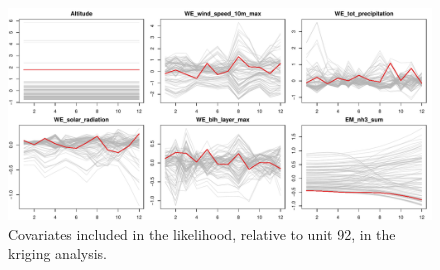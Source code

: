 \documentclass[12pt,	%
	a4paper,		%
	twoside,		%
	openright,		%
	titlepage,%
	]{book}
\theoremstyle{definition}
\begin{document}

\begin{figure}[!ht]
    \centering
    \includegraphics[width=1\linewidth]{Testing/new kriking/unit_92_zoom.pdf}
    \caption[Covariates inspection, kriging analysis]{Covariates included in the likelihood, relative to unit 92, in the kriging analysis.}
    \label{fig:unit 92 zoomd}
\end{figure}
\end{document}
